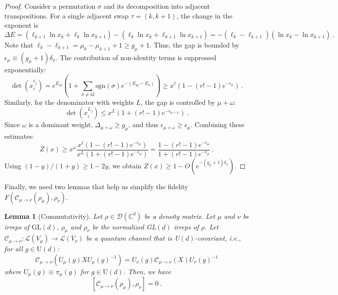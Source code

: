 \documentclass[11pt,letterpaper]{article}
\newtheorem{lem}{Lemma}
\def\C{\mathcal{C}}
\begin{document}
\begin{proof}
    Consider a permutation $\sigma$ and its decomposition into adjacent transpositions. For a single adjacent swap $\tau=(k, k+1)$, the change in the exponent is
    \begin{equation}
        \Delta E = (\ell_{k+1}\ln x_k + \ell_k \ln x_{k+1}) - (\ell_k \ln x_k + \ell_{k+1} \ln x_{k+1}) = -(\ell_k - \ell_{k+1})(\ln x_k - \ln x_{k+1}) \ .
    \end{equation}
    Note that $\ell_k - \ell_{k+1} = \mu_k - \mu_{k+1} + 1 \ge   g_\mu + 1$. Thus, the gap is bounded by $\epsilon_\mu \equiv (  g_\mu+1)\delta_x$.
    The contribution of non-identity terms is suppressed exponentially:
    \begin{equation}
        \det(x_i^{\ell_j}) = e^{E_{\mathrm{id}}} \left( 1 + \sum_{\sigma\neq \mathrm{id}} \mathrm{sgn}(\sigma) e^{-(E_{\mathrm{id}} - E_\sigma)} \right) \ge x^\ell \left( 1 - (r!-1)e^{-\epsilon_\mu} \right) \ .
    \end{equation}
    Similarly, for the denominator with weights $L$, the gap is controlled by $\mu+\omega$:
    \begin{equation}
        \det(x_i^{L_j}) \le x^L \left( 1 + (r!-1)e^{-\epsilon_{\mu+\omega}} \right) \ .
    \end{equation}
    Since $\omega$ is a dominant weight, $\Delta_{\mu+\omega} \ge   g_\mu$, and thus $\epsilon_{\mu+\omega} \ge \epsilon_\mu$. Combining these estimates:
    \begin{equation}
        Z(x) \ge x^\omega \frac{x^\ell (1 - (r!-1)e^{-\epsilon_\mu})}{x^L (1 + (r!-1)e^{-\epsilon_\mu})} = \frac{1 - (r!-1)e^{-\epsilon_\mu}}{1 + (r!-1)e^{-\epsilon_\mu}} \ .
    \end{equation}
    Using $(1-y)/(1+y) \ge 1-2y$, we obtain $Z(x) \ge 1 - O(e^{-(  g_\mu+1)\delta_x})$.
\end{proof}

Finally, we need two lemmas that help us simplify the fidelity $F(\C_{\mu\to\nu}(\rho_\mu),\rho_\nu)$.

\begin{lem}[Commutativity]\label{lem:commutativity}
Let $\rho \in \mathcal{D}(\mathbb{C}^d)$ be a density matrix. Let $\mu$ and $\nu$ be irreps of $\mathrm{GL}(d)$, $ \rho_\mu$ and $ \rho_\nu$ be the normalized GL$(d)$ irreps of $\rho$.
Let $\C_{\mu \to \nu}: \mathcal{L}(V_\mu) \to \mathcal{L}(V_\nu)$ be a quantum channel that is U$(d)$-covariant, i.e., for all $g \in \text{U}(d)$:
\begin{equation}
    \C_{\mu \to \nu}( U_\mu(g) X U_\mu(g)^{-1} ) = U_\nu(g) \C_{\mu \to \nu}(X) U_\nu(g)^{-1}
\end{equation}
where $U_\mu(g) \equiv \pi_\mu(g)$ for $g \in \text{U}(d)$.
Then, we have
\begin{equation}
    \left[ \C_{\mu \to \nu}(\rho_\mu), \rho_\nu \right] = 0 \ .
\end{equation}
\end{lem}
\end{document}
